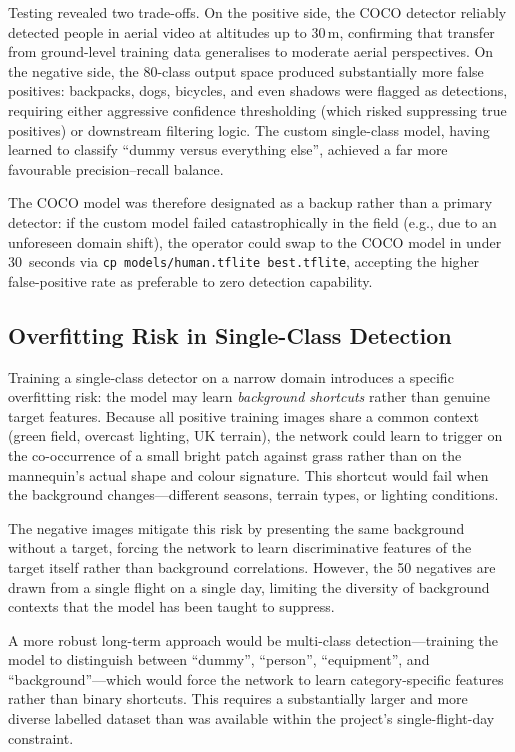 Testing revealed two trade-offs.  On the positive side, the COCO detector reliably detected people in aerial video at altitudes up to 30\,m, confirming that transfer from ground-level training data generalises to moderate aerial perspectives.  On the negative side, the 80-class output space produced substantially more false positives: backpacks, dogs, bicycles, and even shadows were flagged as detections, requiring either aggressive confidence thresholding (which risked suppressing true positives) or downstream filtering logic.  The custom single-class model, having learned to classify ``dummy versus everything else'', achieved a far more favourable precision--recall balance.

The COCO model was therefore designated as a backup rather than a primary detector: if the custom model failed catastrophically in the field (e.g., due to an unforeseen domain shift), the operator could swap to the COCO model in under 30~seconds via \texttt{cp models/human.tflite best.tflite}, accepting the higher false-positive rate as preferable to zero detection capability.

\subsection{Overfitting Risk in Single-Class Detection}\label{sec:model_comparison:overfit}

Training a single-class detector on a narrow domain introduces a specific overfitting risk: the model may learn \emph{background shortcuts} rather than genuine target features.  Because all positive training images share a common context (green field, overcast lighting, UK terrain), the network could learn to trigger on the co-occurrence of a small bright patch against grass rather than on the mannequin's actual shape and colour signature.  This shortcut would fail when the background changes---different seasons, terrain types, or lighting conditions.

The negative images mitigate this risk by presenting the same background without a target, forcing the network to learn discriminative features of the target itself rather than background correlations.  However, the 50 negatives are drawn from a single flight on a single day, limiting the diversity of background contexts that the model has been taught to suppress.

A more robust long-term approach would be multi-class detection---training the model to distinguish between ``dummy'', ``person'', ``equipment'', and ``background''---which would force the network to learn category-specific features rather than binary shortcuts.  This requires a substantially larger and more diverse labelled dataset than was available within the project's single-flight-day constraint.

